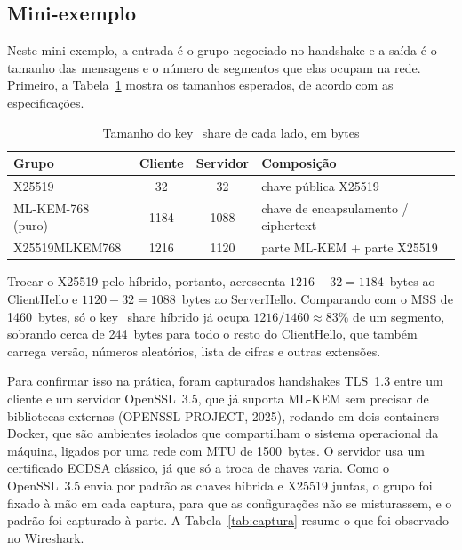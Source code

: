 \documentclass[12pt,a4paper]{article}
\newcommand{\fonte}[1]{\par\vspace{4pt}{\small Fonte: #1}}
\begin{document}
\subsection{Mini-exemplo}
\label{sec:mini}

Neste mini-exemplo, a entrada é o grupo negociado no handshake e a saída
é o tamanho das mensagens e o número de segmentos que elas ocupam na rede.
Primeiro, a Tabela~\ref{tab:tamanhos} mostra os tamanhos esperados, de
acordo com as especificações.

\begin{table}[H]
\centering
\caption{Tamanho do key\_share de cada lado, em bytes}
\label{tab:tamanhos}
\begin{tabular}{lccl}
\toprule
Grupo & Cliente & Servidor & Composição \\
\midrule
X25519 & 32 & 32 & chave pública X25519 \\
ML-KEM-768 (puro) & 1184 & 1088 & chave de encapsulamento / ciphertext \\
X25519MLKEM768 & 1216 & 1120 & parte ML-KEM + parte X25519 \\
\bottomrule
\end{tabular}
\fonte{Langley, Hamburg e Turner (2016), NIST (2024) e Kwiatkowski et al. (2026).}
\end{table}

Trocar o X25519 pelo híbrido, portanto, acrescenta $1216 - 32 = 1184$~bytes
ao ClientHello e $1120 - 32 = 1088$~bytes ao ServerHello.
Comparando com o MSS de 1460~bytes, só o key\_share híbrido já
ocupa $1216 / 1460 \approx 83\%$ de um segmento, sobrando cerca de
244~bytes para todo o resto do ClientHello, que também carrega
versão, números aleatórios, lista de cifras e outras extensões.

Para confirmar isso na prática, foram capturados handshakes TLS~1.3 entre
um cliente e um servidor OpenSSL~3.5, que já suporta ML-KEM sem precisar
de bibliotecas externas (OPENSSL PROJECT, 2025), rodando em dois containers Docker, que são ambientes isolados que
compartilham o sistema operacional da máquina, ligados por uma rede com MTU
de 1500~bytes. O servidor usa um
certificado ECDSA clássico, já que só a troca de chaves varia. Como o
OpenSSL~3.5 envia por padrão as chaves híbrida e X25519 juntas, o grupo
foi fixado à mão em cada captura, para que as configurações não se
misturassem, e o padrão foi capturado à parte. A Tabela~\ref{tab:captura}
resume o que foi observado no Wireshark.
\end{document}
